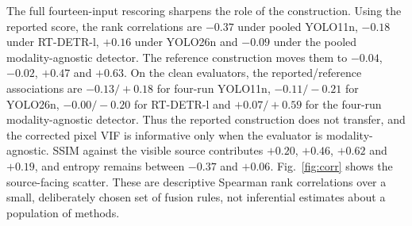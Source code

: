 \documentclass[journal]{IEEEtran}
\begin{document}
\begin{sloppypar}
The full fourteen-input rescoring sharpens the role of the construction. Using the
reported score, the rank correlations are $-0.37$ under pooled YOLO11n, $-0.18$ under
RT-DETR-l, $+0.16$ under YOLO26n and $-0.09$ under the pooled modality-agnostic detector.
The reference construction moves them to $-0.04$, $-0.02$, $+0.47$ and $+0.63$. On the
clean evaluators, the reported/reference associations are $-0.13/+0.18$ for four-run
YOLO11n, $-0.11/-0.21$ for YOLO26n, $-0.00/-0.20$ for RT-DETR-l and $+0.07/+0.59$
for the four-run modality-agnostic detector. Thus the reported construction does not
transfer, and the corrected pixel VIF is informative only when the evaluator is
modality-agnostic. SSIM against the visible
source contributes $+0.20$, $+0.46$, $+0.62$ and $+0.19$, and entropy remains between
$-0.37$ and $+0.06$. Fig.~\ref{fig:corr} shows the source-facing scatter.
These are descriptive Spearman rank correlations over a small, deliberately chosen set
of fusion rules, not inferential estimates about a population of methods.

\begin{table}[!t]\centering\small


\end{table}
\end{sloppypar}
\end{document}
